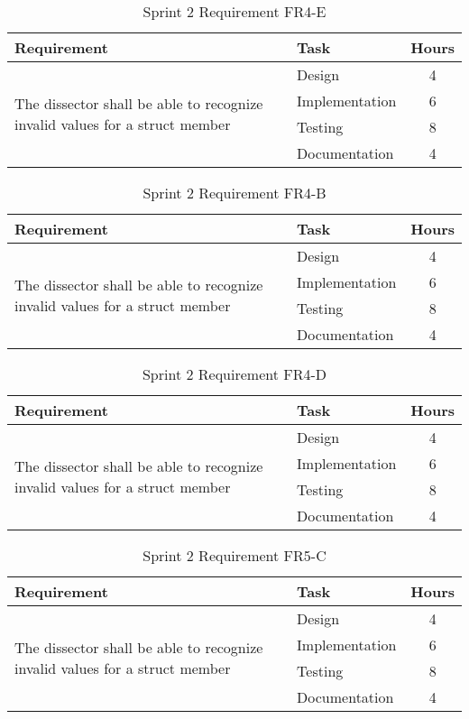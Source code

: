 \begin{table}[!ht] \small \center
\caption{Sprint 2 Requirement FR4-E\label{tab:sp2_req4e}}
\begin{tabular}{l l c}
	\toprule
	Requirement & Task & Hours \\
	\midrule
	\multirow{4}{5cm}{The dissector shall be able to recognize invalid values for a struct member} & Design & 4 \\
	& Implementation & 6 \\
	& Testing & 8 \\
	& Documentation & 4 \\
	\bottomrule
\end{tabular}
\end{table}

\begin{table}[!ht] \small \center
\caption{Sprint 2 Requirement FR4-B\label{tab:sp2_req4b}}
\begin{tabular}{l l c}
	\toprule
	Requirement & Task & Hours \\
	\midrule
	\multirow{4}{5cm}{The dissector shall be able to recognize invalid values for a struct member} & Design & 4 \\
	& Implementation & 6 \\
	& Testing & 8 \\
	& Documentation & 4 \\
	\bottomrule
\end{tabular}
\end{table}

\begin{table}[!ht] \small \center
\caption{Sprint 2 Requirement FR4-D\label{tab:sp2_req4d}}
\begin{tabular}{l l c}
	\toprule
	Requirement & Task & Hours \\
	\midrule
	\multirow{4}{5cm}{The dissector shall be able to recognize invalid values for a struct member} & Design & 4 \\
	& Implementation & 6 \\
	& Testing & 8 \\
	& Documentation & 4 \\
	\bottomrule
\end{tabular}
\end{table}

\begin{table}[!ht] \small \center
\caption{Sprint 2 Requirement FR5-C\label{tab:sp2_req5c}}
\begin{tabular}{l l c}
	\toprule
	Requirement & Task & Hours \\
	\midrule
	\multirow{4}{5cm}{The dissector shall be able to recognize invalid values for a struct member} & Design & 4 \\
	& Implementation & 6 \\
	& Testing & 8 \\
	& Documentation & 4 \\
	\bottomrule
\end{tabular}
\end{table}

